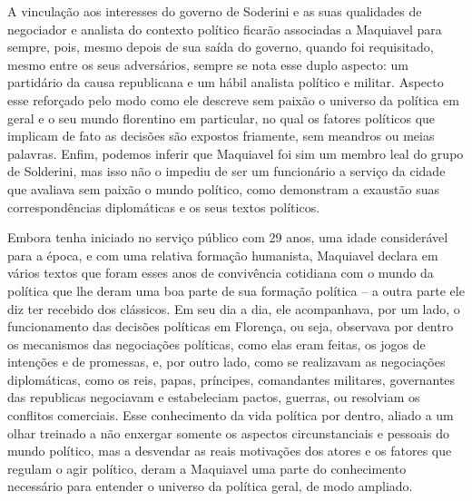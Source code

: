 A vinculação aos interesses do governo de Soderini e as suas qualidades
de negociador e analista do contexto político ficarão associadas a
Maquiavel para sempre, pois, mesmo depois de sua saída do governo,
quando foi requisitado, mesmo entre os seus adversários, sempre se nota
esse duplo aspecto: um partidário da causa republicana e um hábil
analista político e militar. Aspecto esse reforçado pelo modo como ele
descreve sem paixão o universo da política em geral e o seu mundo
florentino em particular, no qual os fatores políticos que implicam de
fato as decisões são expostos friamente, sem meandros ou meias palavras.
Enfim, podemos inferir que Maquiavel foi sim um membro leal do grupo de
Solderini, mas isso não o impediu de ser um funcionário a serviço da
cidade que avaliava sem paixão o mundo político, como demonstram a
exaustão suas correspondências diplomáticas e os seus textos políticos.

Embora tenha iniciado no serviço público com 29 anos, uma idade
considerável para a época, e com uma relativa formação humanista,
Maquiavel declara em vários textos que foram esses anos de convivência
cotidiana com o mundo da política que lhe deram uma boa parte de sua
formação política -- a outra parte ele diz ter recebido dos clássicos.
Em seu dia a dia, ele acompanhava, por um lado, o funcionamento das
decisões políticas em Florença, ou seja, observava por dentro os
mecanismos das negociações políticas, como elas eram feitas, os jogos de
intenções e de promessas, e, por outro lado, como se realizavam as
negociações diplomáticas, como os reis, papas, príncipes, comandantes
militares, governantes das republicas negociavam e estabeleciam pactos,
guerras, ou resolviam os conflitos comerciais. Esse conhecimento da vida
política por dentro, aliado a um olhar treinado a não enxergar somente
os aspectos circunstanciais e pessoais do mundo político, mas a
desvendar as reais motivações dos atores e os fatores que regulam o agir
político, deram a Maquiavel uma parte do conhecimento necessário para
entender o universo da política geral, de modo ampliado.

